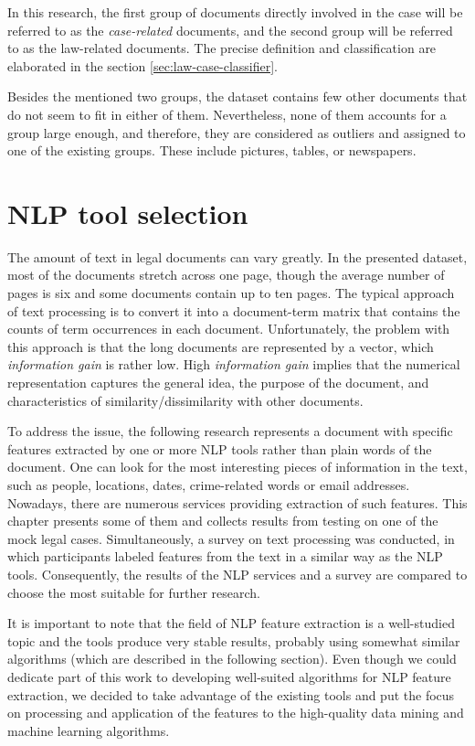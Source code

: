 \documentclass[
  digital, %
  notable,   %
  nolof,     %
  nolot,     %
]{fithesis3}
\begin{document}
In this research, the first group of documents directly involved in the case will be referred to as the \textit{case-related} documents, and the second group will be referred to as the law-related documents.
The precise definition and classification are elaborated in the section \ref{sec:law-case-classifier}.

Besides the mentioned two groups, the dataset contains few other documents that do not seem to fit in either of them.
Nevertheless, none of them accounts for a group large enough, and therefore, they are considered as outliers and assigned to one of the existing groups.
These include pictures, tables, or newspapers.

\chapter{NLP tool selection}
\label{chp:nlp}
The amount of text in legal documents can vary greatly.
In the presented dataset, most of the documents stretch across one page, though the average number of pages is six and some documents contain up to ten pages.
The typical approach of text processing is to convert it into a document-term matrix that contains the counts of term occurrences in each document.
Unfortunately, the problem with this approach is that the long documents are represented by a vector, which \emph{information gain} is rather low.
High \emph{information gain} implies that the numerical representation captures the general idea, the purpose of the document, and characteristics of similarity/dissimilarity with other documents.

To address the issue, the following research represents a document with specific features extracted by one or more NLP tools rather than plain words of the document.
One can look for the most interesting pieces of information in the text, such as people, locations, dates, crime-related words or email addresses.
Nowadays, there are numerous services providing extraction of such features.
This chapter presents some of them and collects results from testing on one of the mock legal cases.
Simultaneously, a survey on text processing was conducted, in which participants labeled features from the text in a similar way as the NLP tools.
Consequently, the results of the NLP services and a survey are compared to choose the most suitable for further research. 

It is important to note that the field of NLP feature extraction is a well-studied topic and the tools produce very stable results, probably using somewhat similar algorithms (which are described in the following section). Even though we could dedicate part of this work to developing well-suited algorithms for NLP feature extraction, we decided to take advantage of the existing tools and put the focus on processing and application of the features to the high-quality data mining and machine learning algorithms. 
\end{document}
